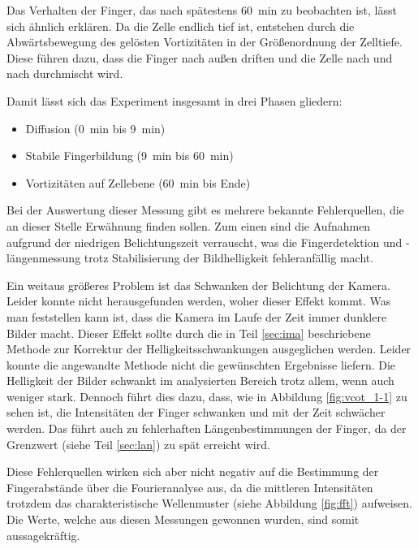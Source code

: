 Das Verhalten der Finger, das nach spätestens \SI{60}{\minute} zu beobachten ist, lässt sich ähnlich erklären. Da die Zelle endlich tief ist, entstehen durch die Abwärtsbewegung des gelösten \COT Vortizitäten in der Größenordnung der Zelltiefe. Diese führen dazu, dass die Finger nach außen driften und die Zelle nach und nach durchmischt wird.

Damit lässt sich das Experiment insgesamt in drei Phasen gliedern:
\begin{itemize}
 \item Diffusion (\SI{0}{\minute} bis \SI{9}{\minute})
 \item Stabile Fingerbildung (\SI{9}{\minute} bis \SI{60}{\minute})
 \item Vortizitäten auf Zellebene (\SI{60}{\minute} bis Ende)
\end{itemize}


Bei der Auswertung dieser Messung gibt es mehrere bekannte Fehlerquellen, die an dieser Stelle Erwähnung finden sollen. Zum einen sind die Aufnahmen aufgrund der niedrigen Belichtungszeit verrauscht, was die Fingerdetektion und \mbox{-längenmessung} trotz Stabilisierung der Bildhelligkeit fehleranfällig macht.

Ein weitaus größeres Problem ist das Schwanken der Belichtung der Kamera. Leider konnte nicht herausgefunden werden, woher dieser Effekt kommt. Was man feststellen kann ist, dass die Kamera im Laufe der Zeit immer dunklere Bilder macht. Dieser Effekt sollte durch die in Teil \ref{sec:ima} beschriebene Methode zur Korrektur der Helligkeitsschwankungen ausgeglichen werden. Leider konnte die angewandte Methode nicht die gewünschten Ergebnisse liefern. Die Helligkeit der Bilder schwankt im analysierten Bereich trotz allem, wenn auch weniger stark. Dennoch führt dies dazu, dass, wie in Abbildung \ref{fig:vcot_1-1} zu sehen ist, die Intensitäten der Finger schwanken und mit der Zeit schwächer werden. Das führt auch zu fehlerhaften Längenbestimmungen der Finger, da der Grenzwert (siehe Teil \ref{sec:lan}) zu spät erreicht wird.

Diese Fehlerquellen wirken sich aber nicht negativ auf die Bestimmung der Fingerabstände über die Fourieranalyse aus, da die mittleren Intensitäten trotzdem das charakteristische Wellenmuster (siehe Abbildung \ref{fig:fft}) aufweisen. Die Werte, welche aus diesen Messungen gewonnen wurden, sind somit aussagekräftig.



